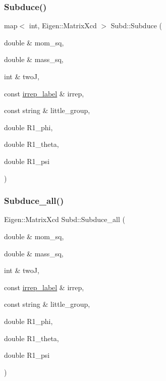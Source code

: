 \subsubsection{\texorpdfstring{Subduce()}{Subduce()}}
{\footnotesize\ttfamily map$<$ int, Eigen\+::\+Matrix\+Xcd $>$ Subd\+::\+Subduce (\begin{DoxyParamCaption}\item[{double \&}]{mom\+\_\+sq,  }\item[{double \&}]{mass\+\_\+sq,  }\item[{int \&}]{twoJ,  }\item[{const \mbox{\hyperlink{structirrep__label}{irrep\+\_\+label}} \&}]{irrep,  }\item[{const string \&}]{little\+\_\+group,  }\item[{double}]{R1\+\_\+phi,  }\item[{double}]{R1\+\_\+theta,  }\item[{double}]{R1\+\_\+psi }\end{DoxyParamCaption})}

\mbox{\label{namespaceSubd_a8712bb4f2b8dfa69f03cc781b7d48e85}} 
\subsubsection{\texorpdfstring{Subduce\_all()}{Subduce\_all()}}
{\footnotesize\ttfamily Eigen\+::\+Matrix\+Xcd Subd\+::\+Subduce\+\_\+all (\begin{DoxyParamCaption}\item[{double \&}]{mom\+\_\+sq,  }\item[{double \&}]{mass\+\_\+sq,  }\item[{int \&}]{twoJ,  }\item[{const \mbox{\hyperlink{structirrep__label}{irrep\+\_\+label}} \&}]{irrep,  }\item[{const string \&}]{little\+\_\+group,  }\item[{double}]{R1\+\_\+phi,  }\item[{double}]{R1\+\_\+theta,  }\item[{double}]{R1\+\_\+psi }\end{DoxyParamCaption})}

